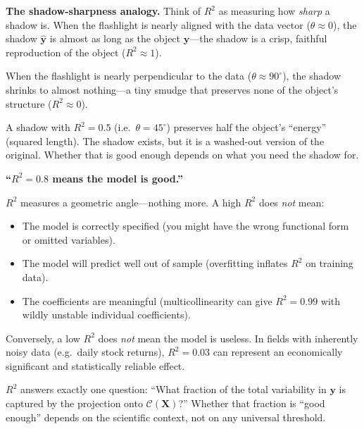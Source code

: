 \documentclass[11pt,a4paper]{article}
\theoremstyle{plain}
\theoremstyle{definition}
\newcommand{\yhat}{\hat{\bm{y}}}
\newcommand{\bX}{\bm{X}}
\newcommand{\by}{\bm{y}}
\newcommand{\Col}{\mathcal{C}}
\begin{document}
\medskip
\noindent\textbf{The shadow-sharpness analogy.}
Think of $R^2$ as measuring how \emph{sharp} a shadow is.
When the flashlight is nearly aligned with the data vector
($\theta \approx 0$), the shadow $\yhat$ is almost as long as the
object $\by$---the shadow is a crisp, faithful reproduction of the
object ($R^2 \approx 1$).

When the flashlight is nearly perpendicular to the data
($\theta \approx 90^\circ$), the shadow shrinks to almost nothing---a
tiny smudge that preserves none of the object's structure ($R^2 \approx 0$).

A shadow with $R^2 = 0.5$ (i.e.\ $\theta = 45^\circ$) preserves half
the object's ``energy'' (squared length).
The shadow exists, but it is a washed-out version of the original.
Whether that is good enough depends on what you need the shadow for.

\begin{misconception}
\textbf{``$R^2 = 0.8$ means the model is good.''}

$R^2$ measures a geometric angle---nothing more.
A high $R^2$ does \emph{not} mean:
\begin{itemize}[nosep]
  \item The model is correctly specified (you might have the wrong
        functional form or omitted variables).
  \item The model will predict well out of sample (overfitting
        inflates $R^2$ on training data).
  \item The coefficients are meaningful (multicollinearity can give
        $R^2 = 0.99$ with wildly unstable individual coefficients).
\end{itemize}
Conversely, a low $R^2$ does \emph{not} mean the model is useless.
In fields with inherently noisy data (e.g.\ daily stock returns),
$R^2 = 0.03$ can represent an economically significant and
statistically reliable effect.

$R^2$ answers exactly one question: ``What fraction of the total
variability in $\by$ is captured by the projection onto $\Col(\bX)$?''
Whether that fraction is ``good enough'' depends on the scientific
context, not on any universal threshold.
\end{misconception}
\end{document}
